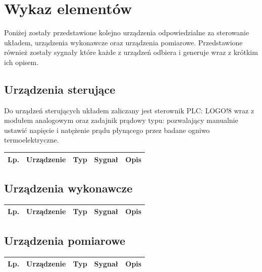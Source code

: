 \documentclass[oneside]{mgr}
\begin{document}
\section{Wykaz elementów}
Poniżej zostały przedstawione kolejno urządzenia odpowiedzialne za sterowanie układem, urządzenia wykonawcze oraz urządzenia pomiarowe. Przedstawione również zostały sygnały które każde z urządzeń odbiera i generuje wraz z krótkim ich opisem.
\subsection{Urządzenia sterujące}
Do urządzeń sterujących układem zaliczany jest sterownik PLC: LOGO!8 wraz z modułem analogowym oraz zadajnik prądowy typu: pozwalający manualnie ustawić napięcie i natężenie prądu płynącego przez badane ogniwo termoelektryczne.
\newline

\begin{center}
\begin{tabular}{|c|c|c|c|c|c|}
\hline
    Lp. & \multicolumn{2}{|c|}{Urządzenie} & Typ & Sygnał & Opis \\\hline
\end{tabular}
\end{center}


\subsection{Urządzenia wykonawcze}
\begin{center}
\begin{tabular}{|c|c|c|c|c|c|}
\hline
    Lp. & \multicolumn{2}{|c|}{Urządzenie} & Typ & Sygnał & Opis \\\hline
\end{tabular}
\end{center}
\subsection{Urządzenia pomiarowe}
\begin{center}
\begin{tabular}{|c|c|c|c|c|c|}
\hline
    Lp. & \multicolumn{2}{|c|}{Urządzenie} & Typ & Sygnał & Opis \\\hline
\end{tabular}
\end{center}
\end{document}
